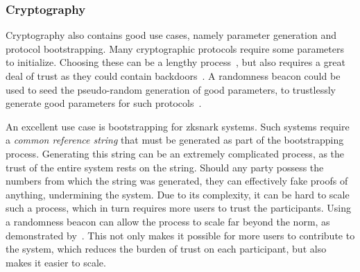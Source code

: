 \subsubsection{Cryptography}
Cryptography also contains good use cases, namely parameter generation and protocol bootstrapping.
Many cryptographic protocols require some parameters to initialize.
Choosing these can be a lengthy process~\cite{mpcsnarks}, but also requires a great deal of trust as they could contain backdoors~\cite{nist2014backdoor}.
A randomness beacon could be used to seed the pseudo-random generation of good parameters, to trustlessly generate good parameters for such protocols~\cite{baigneres2015trap}.

An excellent use case is bootstrapping for \gls{zksnark} systems. Such systems require a \emph{common reference string} that must be generated as part of the bootstrapping process. Generating this string can be an extremely complicated process, as the trust of the entire system rests on the string. Should any party possess the numbers from which the string was generated, they can effectively fake proofs of anything, undermining the system. Due to its complexity, it can be hard to scale such a process, which in turn requires more users to trust the participants. Using a randomness beacon can allow the process to scale far beyond the norm, as demonstrated by~\citet{mpcsnarks}. This not only makes it possible for more users to contribute to the system, which reduces the burden of trust on each participant, but also makes it easier to scale.

